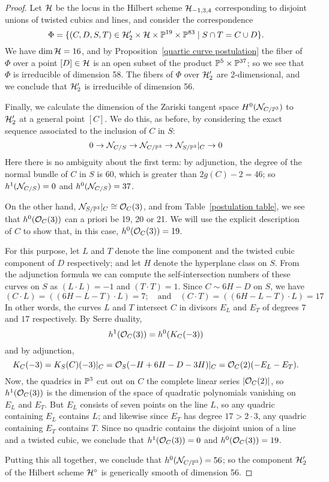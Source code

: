 \begin{proof}
Let $\cH$ be the locus in the Hilbert scheme $\cH_{-1, 3, 4}$ corresponding to disjoint unions of twisted cubics and lines, and consider the correspondence
$$
\Phi = \{(C,D,S,T) \in \cH_{2}' \times \cH \times \PP^{19} \times \PP^{83} \mid S \cap T = C \cup D \}.
$$
We have $\dim \cH = 16$, and  by Proposition~\ref{quartic curve postulation} the fiber of $\Phi$ over a point $[D] \in \cH$ is an open subset of the product $\PP^5 \times \PP^{37}$;  so we see that $\Phi$ is irreducible of dimension 58. The fibers of $\Phi$ over $ \cH_{2}'$ are 2-dimensional, and we conclude that $\cH_{2}'$ is irreducible of dimension 56.

Finally, we calculate the dimension of the Zariski tangent space $H^0(\cN_{C/\PP^3})$ to $\cH_{2}'$ at a general point $[C]$. We do this, as before, by considering the exact sequence associated to the inclusion of $C$ in $S$:
$$
0 \to \cN_{C/S} \to \cN_{C/\PP^3} \to \cN_{S/\PP^3}|_C \to 0
$$ 
Here there is no ambiguity about the first term: by adjunction, the degree of the normal bundle of $C$ in $S$
is 60, which is greater than $2g(C) - 2 = 46$; so $h^1(\cN_{C/S}) = 0$ and $h^0(\cN_{C/S}) = 37$.

On the other hand, $\cN_{S/\PP^3}|_C \cong \cO_C(3)$, and from Table~\ref{postulation table}, we see that $h^0( \cO_C(3))$ can a priori be 19, 20 or 21. We will use the explicit description of $C$ to show that,  in this case, $h^0(\cO_C(3))=19$.

For this purpose, let $L$ and $T$ denote the line component and the twisted cubic component of $D$ respectively; and let $H$ denote the hyperplane class on $S$. From the adjunction formula we can compute the self-intersection numbers of these curves on $S$ as $(L \cdot L) = -1$ and $(T \cdot T) = 1$. Since $C \sim 6H - D$ on $S$, we have
$$
(C\cdot L) = ((6H - L - T) \cdot L) = 7; \quad \text{and} \quad (C\cdot T) = ((6H - L - T) \cdot L) = 17
$$
In other words, the curves $L$ and $T$ intersect $C$ in divisors $E_L$ and $E_T$ of degrees $7$ and $17$ respectively. By Serre duality, 
$$
h^1(\cO_C(3)) = h^0(K_C(-3)) 
$$
and by adjunction,
$$
K_C(-3) = K_S(C)(-3)|_C = \cO_S(-H + 6H - D - 3H)|_C = \cO_C(2)(-E_L-E_T).
$$
Now, the quadrics in $\PP^3$ cut out on $C$ the complete linear series $|\cO_C(2)|$, 
so $h^1(\cO_C(3))$ is the dimension of the space of quadratic polynomials vanishing on $E_L$ and $E_T$. But $E_L$ consists of seven points on the line $L$, so any quadric containing $E_L$ contains $L$; and likewise since $E_T$ has degree $17 > 2\cdot 3$, any quadric containing $E_T$ contains $T$. Since no quadric contains the disjoint union of a line and a twisted cubic, we conclude that $h^1(\cO_C(3))=0$ and $h^0(\cO_C(3)) = 19$.

Putting this all together, we conclude that $h^0(\cN_{C/\PP^3}) = 56$; so the component $\cH_{2}'$ of the Hilbert scheme $\cH^\circ$ is generically smooth of dimension 56.
\end{proof}

